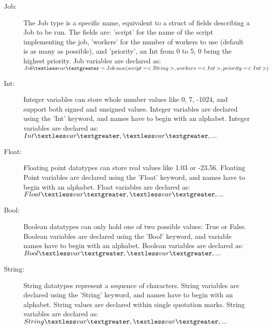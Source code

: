\begin{description}
\item [Job:] The Job type is a \lang{} specific name, equivalent to a struct
of fields describing a Job to be run. The fields are: 'script' for the
name of the script implementing the job, 'workers' for the number of workers to use
(default is as many as possible), and 'priority', an Int from 0 to 5, 0 being the
highest priority.
Job variables are declared as:
$Job \textless var\textgreater = Job.new(script=<String>, workers=<Int>, priority=<Int>)$

\item [Int:] Integer variables can store whole number values like 0, 7, -1024,
and support both signed and unsigned values. Integer variables are declared
using the 'Int' keyword, and names have to begin with an alphabet.
Integer variables are declared as:
$Int \textless var\textgreater, \textless var\textgreater, ...$ 


\item [Float:] Floating point datatypes can store real values like 1.03 or -23.56.
Floating Point variables are declared using the 'Float' keyword, and names
have to begin with an alphabet. Float variables are declared as:
$Float \textless  var\textgreater, \textless  var\textgreater, ...$



\item [Bool:] Boolean datatypes can only hold one of two possible values:
True or False. Boolean variables are declared using the 'Bool' keyword, and variable
names have to begin with an alphabet. Boolean variables are declared as:
$Bool \textless  var\textgreater, \textless  var\textgreater, ...$
%



\item [String:] String datatypes represent a sequence of characters. String
variables are declared using the 'String' keyword, and names have to begin
with an alphabet. String values are declared within single quotation marks.
String variables are declared as:
$String \textless var\textgreater, \textless  var\textgreater, ...$


\end{description}
